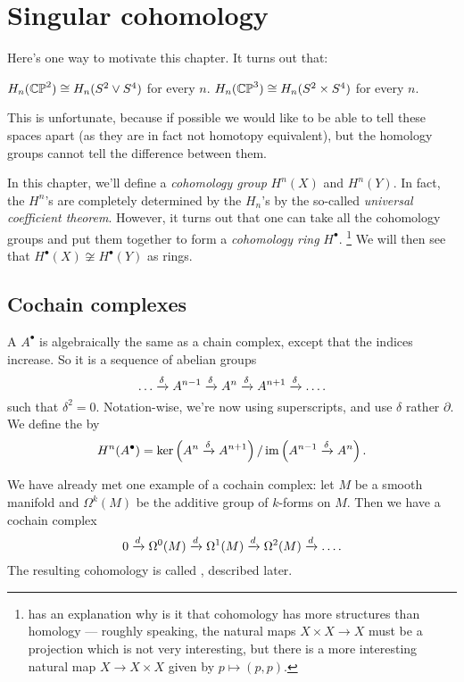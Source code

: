 \chapter{Singular cohomology}
Here's one way to motivate this chapter. It turns out that:
\begin{itemize}
	\ii $H_n(\mathbb{CP}^2) \cong H_n(S^2 \vee S^4)$ for every $n$.
	\ii $H_n(\mathbb{CP}^3) \cong H_n(S^2 \times S^4)$ for every $n$.
\end{itemize}
This is unfortunate, because if possible we would like
to be able to tell these spaces apart (as they are
in fact not homotopy equivalent), but the homology groups
cannot tell the difference between them.

In this chapter, we'll define a \emph{cohomology group} $H^n(X)$ and $H^n(Y)$.
In fact, the $H^n$'s are completely determined by the $H_n$'s
by the so-called \emph{universal coefficient theorem}.
However, it turns out that one can take all the cohomology groups and put
them together to form a \emph{cohomology ring} $H^\bullet$.%
\footnote{\cite{ref:hatcher} has an explanation why is it that cohomology has more structures than
homology --- roughly speaking, the natural maps $X \times X \to X$ must be a projection which is not
very interesting, but there is a more interesting natural map $X \to X \times X$ given by $p \mapsto
(p, p)$.}
We will then see that $H^\bullet(X) \not\cong H^\bullet(Y)$ as rings.

\section{Cochain complexes}
\begin{definition}
A  $A^\bullet$ is algebraically the same as a chain complex,
except that the indices increase.
So it is a sequence of abelian groups
\[ \dots \xrightarrow{\delta} A^{n-1} \xrightarrow{\delta} A^n \xrightarrow{\delta} A^{n+1} \xrightarrow{\delta} \dots. \]
such that $\delta^2 = 0$.
Notation-wise, we're now using superscripts, and use $\delta$ rather $\partial$.
We define the  by
\[ H^n(A^\bullet) = \ker\left( A^n \xrightarrow{\delta} A^{n+1} \right)
	/ \operatorname{im}\left( A^{n-1} \xrightarrow{\delta} A^n \right). \]
\end{definition}

\begin{example}
	We have already met one example of a cochain complex:
	let $M$ be a smooth manifold and $\Omega^k(M)$ be the
	additive group of $k$-forms on $M$.
	Then we have a cochain complex
	\[ 0 \xrightarrow{d} \Omega^0(M)
		\xrightarrow{d} \Omega^1(M) \xrightarrow{d} \Omega^2(M)
		\xrightarrow{d} \dots. \]
	The resulting cohomology is called ,
	described later.
\end{example}

